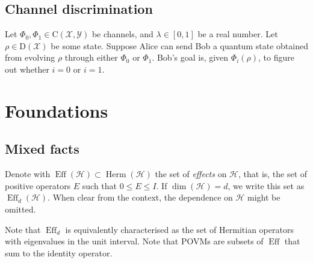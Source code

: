 \documentclass[12pt]{report}
\newcommand{\on}[1]{\operatorname{#1}}
\newcommand{\calH}{{\mathcal{H}}}
\newcommand{\calY}{{\mathcal{Y}}}
\newcommand{\calX}{{\mathcal{X}}}
\newcommand{\rmC}{{\mathrm{C}}}
\newcommand{\rmD}{{\mathrm{D}}}
\DeclareMathOperator{\Herm}{Herm}
\begin{document}
\section{Channel discrimination}

Let $\Phi_0,\Phi_1\in\rmC(\calX,\calY)$ be channels, and $\lambda\in[0,1]$ be a real number. Let $\rho\in\rmD(\calX)$ be some state.
Suppose Alice can send Bob a quantum state obtained from evolving $\rho$ through either $\Phi_0$ or $\Phi_1$.
Bob's goal is, given $\Phi_i(\rho)$, to figure out whether $i=0$ or $i=1$.



\chapter{Foundations}

\section{Mixed facts}

\begin{defn}[Effects]
	Denote with $\on{Eff}(\calH)\subset\Herm(\calH)$ the set of \emph{effects} on $\calH$, that is, the set of positive operators $E$ such that $0\le E \le I$. If $\dim(\calH)=d$, we write this set as $\on{Eff}_d(\calH)$. When clear from the context, the dependence on $\calH$ might be omitted.
\end{defn}
Note that $\on{Eff}_d$ is equivalently characterised as the set of Hermitian operators with eigenvalues in the unit interval.
Note that POVMs are subsets of $\on{Eff}$ that sum to the identity operator.
\end{document}
